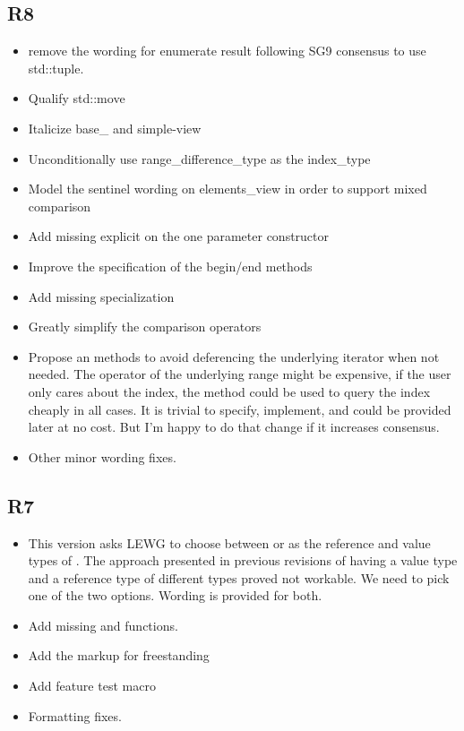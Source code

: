 \documentclass{wg21}
\begin{document}
\subsection{R8}
\begin{itemize}
	\item remove the wording for enumerate result following SG9 consensus to use std::tuple.
	\item Qualify std::move
	\item Italicize base_ and simple-view
	\item Unconditionally use range_difference_type as the index_type
	\item Model the sentinel wording on elements_view in order to support mixed comparison
	\item  Add missing explicit on the one parameter constructor
	\item Improve the specification of the begin/end methods
	\item Add missing  specialization
	\item Greatly simplify the comparison operators
	\item Propose an  methods to avoid deferencing the underlying iterator when not needed. The \tcode{*} operator
	of the underlying range might be expensive, if the user only cares about the index, the  method could be used
	to query the index cheaply in all cases. It is trivial to specify, implement, and could be provided later at no cost. But I'm happy
	to do that change if it increases consensus.
	\item Other minor wording fixes.
\end{itemize}

\subsection{R7}
\begin{itemize}
    \item This version asks LEWG to choose between  or  as the reference and value types of .
    The approach presented in previous revisions of having a value type and a reference type of different types proved not workable.
    We need to pick one of the two options. Wording is provided for both.

    \item Add missing  and  functions.
    \item Add the markup for freestanding
    \item Add feature test macro
    \item Formatting fixes.
\end{itemize}
\end{document}
